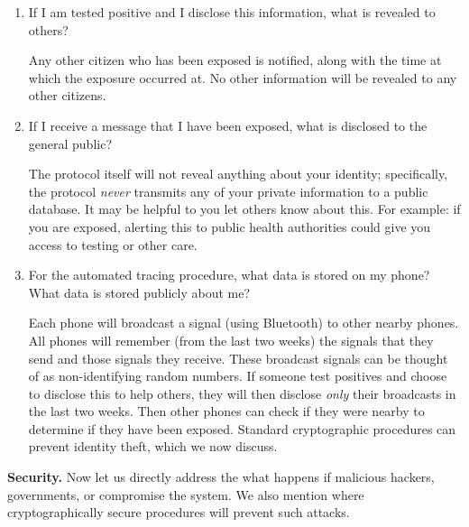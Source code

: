 \documentclass{article}
\begin{document}
\begin{enumerate}[leftmargin=*]
\item If I am tested positive and I disclose this information, what is revealed to others?

Any other citizen who has been exposed is notified, along with the time at which the exposure occurred at. No other information will be revealed to any other citizens.

\item If I receive a message that I have been exposed, what is disclosed to the general public? 
 
The protocol itself will not reveal anything about your identity; specifically, the protocol \emph{never} transmits any of your private information to a public database. It may be helpful to you let others know about this. For example: if you are exposed, alerting this to public health authorities could give you access to testing or other care. 

\item For the automated tracing procedure, what data is stored on my phone? What data is stored publicly about me?

Each phone will broadcast a signal (using Bluetooth) to other nearby phones. All phones will remember (from the last two weeks) the signals that they send and those signals they receive. These broadcast signals can be thought of as non-identifying random numbers. If someone test positives and choose to disclose this to help others, they will then disclose \emph{only} their broadcasts in the last two weeks. Then other phones can check if they were nearby to determine if they have been exposed. Standard cryptographic procedures can prevent identity theft, which we now discuss.

\end{enumerate}

\textbf{Security.} Now let us directly address the what happens if malicious hackers, governments, or compromise the system. We also mention where cryptographically secure procedures will prevent such attacks.   
\end{document}
